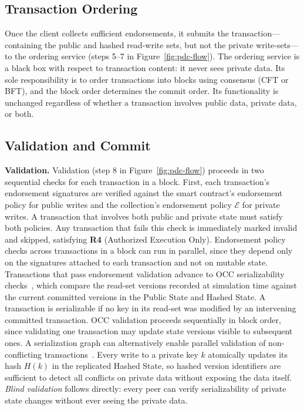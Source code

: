 \subsection{Transaction Ordering}
Once the client collects sufficient endorsements, it submits the transaction---containing the public and hashed read-write sets, but not the private write-sets---to the ordering service (steps 5--7 in Figure~\ref{fig:pdc-flow}). The ordering service is a black box with respect to transaction content: it never sees private data. Its sole responsibility is to order transactions into blocks using consensus (CFT or BFT), and the block order determines the commit order. Its functionality is unchanged regardless of whether a transaction involves public data, private data, or both.

\subsection{Validation and Commit}
\noindent\textbf{Validation.}
Validation (step 8 in Figure~\ref{fig:pdc-flow}) proceeds in two sequential checks for each transaction in a block. First, each transaction's endorsement signatures are verified against the smart contract's endorsement policy for public writes and the collection's endorsement policy $\mathcal{E}$ for private writes. A transaction that involves both public and private state must satisfy both policies. Any transaction that fails this check is immediately marked invalid and skipped, satisfying \textbf{R4} (Authorized Execution Only). Endorsement policy checks across transactions in a block can run in parallel, since they depend only on the signatures attached to each transaction and not on mutable state.
Transactions that pass endorsement validation advance to OCC serializability checks~\cite{occ}, which compare the read-set versions recorded at simulation time against the current committed versions in the Public State and Hashed State. A transaction is serializable if no key in its read-set was modified by an intervening committed transaction. OCC validation proceeds sequentially in block order, since validating one transaction may update state versions visible to subsequent ones. A serialization graph can alternatively enable parallel validation of non-conflicting transactions~\cite{perf-concurrency, sparse-peer}.
Every write to a private key $k$ atomically updates its hash $H(k)$ in the replicated Hashed State, so hashed version identifiers are sufficient to detect all conflicts on private data without exposing the data itself. \textit{Blind validation} follows directly: every peer can verify serializability of private state changes without ever seeing the private data.


